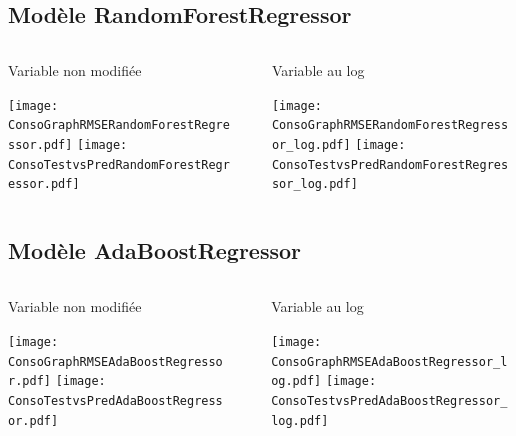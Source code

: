 \documentclass[8pt,aspectratio=169,hyperref={unicode=true}]{beamer}
\begin{document}
\subsection{Modèle RandomForestRegressor}
\begin{frame}[t]{\insertsubsection}
  \begin{columns}
    \begin{column}{.33\textwidth}
      {\centering Variable non modifiée

      }
      \texttt{[image: ConsoGraphRMSERandomForestRegressor.pdf]}
      \texttt{[image: ConsoTestvsPredRandomForestRegressor.pdf]}
    \end{column}
    \begin{column}{.33\textwidth}

    \end{column}
    \begin{column}{.33\textwidth}
      {\centering Variable au log

      }
      \texttt{[image: ConsoGraphRMSERandomForestRegressor\_log.pdf]}
      \texttt{[image: ConsoTestvsPredRandomForestRegressor\_log.pdf]}
    \end{column}
  \end{columns}
\end{frame}

\subsection{Modèle AdaBoostRegressor}
\begin{frame}[t]{\insertsubsection}
  \begin{columns}
    \begin{column}{.33\textwidth}
      {\centering Variable non modifiée

      }
      \texttt{[image: ConsoGraphRMSEAdaBoostRegressor.pdf]}
      \texttt{[image: ConsoTestvsPredAdaBoostRegressor.pdf]}
    \end{column}
    \begin{column}{.33\textwidth}

    \end{column}
    \begin{column}{.33\textwidth}
      {\centering Variable au log

      }
      \texttt{[image: ConsoGraphRMSEAdaBoostRegressor\_log.pdf]}
      \texttt{[image: ConsoTestvsPredAdaBoostRegressor\_log.pdf]}
    \end{column}
  \end{columns}
\end{frame}
\end{document}
